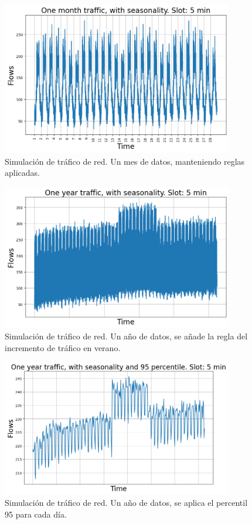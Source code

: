 \documentclass[a4paper, oneside, 12pt]{book}
\begin{document}
\begin{enumerate}
		\pagebreak
		
		\begin{figure}[h!]
			\includegraphics[width=0.9\textwidth, center]{img/anexo_5.png}
			\caption{Simulación de tráfico de red. Un mes de datos, manteniendo reglas aplicadas.}
			\label{img: anexo 5}
		\end{figure}
	
		\begin{figure}[h!]
			\includegraphics[width=0.9\textwidth, center]{img/anexo_6.png}
			\caption{Simulación de tráfico de red. Un año de datos, se añade la regla del incremento de tráfico en verano.}
			\label{img: anexo 6}
		\end{figure}
	
		\pagebreak
	
		\begin{figure}[h!]
			\includegraphics[width=0.9\textwidth, center]{img/anexo_7.png}
			\caption{Simulación de tráfico de red. Un año de datos, se aplica el percentil 95 para cada día.}
			\label{img: anexo 7}
		\end{figure}
	

\end{enumerate}
\end{document}

